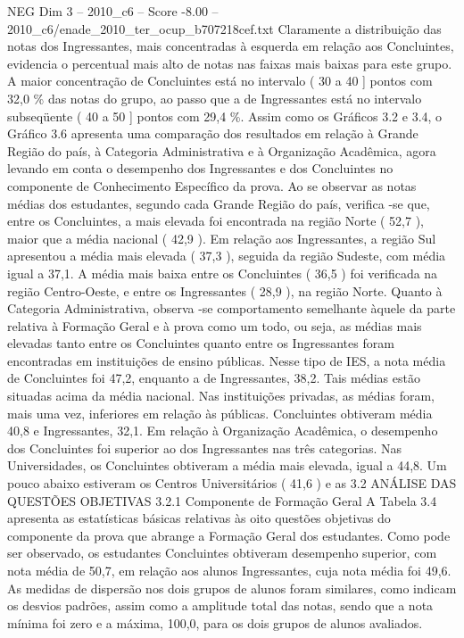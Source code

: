 \begin{textsample}{NEG Dim 3 – 2010\_c6 – Score -8.00 – 2010\_c6/enade\_2010\_ter\_ocup\_b707218cef.txt}
Claramente a distribuição das notas dos Ingressantes, mais concentradas à esquerda em relação aos Concluintes, evidencia o percentual mais alto de notas nas faixas mais baixas para este grupo.
A maior concentração de Concluintes está no intervalo ( 30 a 40 ] pontos com 32,0 \% das notas do grupo, ao passo que a de Ingressantes está no intervalo subseqüente ( 40 a 50 ] pontos com 29,4 \%.
Assim como os Gráficos 3.2 e 3.4, o Gráfico 3.6 apresenta uma comparação dos resultados em relação à Grande Região do país, à Categoria Administrativa e à Organização Acadêmica, agora levando em conta o desempenho dos Ingressantes e dos Concluintes no componente de Conhecimento Específico da prova.
Ao se observar as notas médias dos estudantes, segundo cada Grande Região do país, verifica -se que, entre os Concluintes, a mais elevada foi encontrada na região Norte ( 52,7 ), maior que a média nacional ( 42,9 ).
Em relação aos Ingressantes, a região Sul apresentou a média mais elevada ( 37,3 ), seguida da região Sudeste, com média igual a 37,1.
A média mais baixa entre os Concluintes ( 36,5 ) foi verificada na região Centro-Oeste, e entre os Ingressantes ( 28,9 ), na região Norte.
Quanto à Categoria Administrativa, observa -se comportamento semelhante àquele da parte relativa à Formação Geral e à prova como um todo, ou seja, as médias mais elevadas tanto entre os Concluintes quanto entre os Ingressantes foram encontradas em instituições de ensino públicas.
Nesse tipo de IES, a nota média de Concluintes foi 47,2, enquanto a de Ingressantes, 38,2.
Tais médias estão situadas acima da média nacional.
Nas instituições privadas, as médias foram, mais uma vez, inferiores em relação às públicas.
Concluintes obtiveram média 40,8 e Ingressantes, 32,1.
Em relação à Organização Acadêmica, o desempenho dos Concluintes foi superior ao dos Ingressantes nas três categorias.
Nas Universidades, os Concluintes obtiveram a média mais elevada, igual a 44,8.
Um pouco abaixo estiveram os Centros Universitários ( 41,6 ) e as 3.2 ANÁLISE DAS QUESTÕES OBJETIVAS 3.2.1 Componente de Formação Geral A Tabela 3.4 apresenta as estatísticas básicas relativas às oito questões objetivas do componente da prova que abrange a Formação Geral dos estudantes.
Como pode ser observado, os estudantes Concluintes obtiveram desempenho superior, com nota média de 50,7, em relação aos alunos Ingressantes, cuja nota média foi 49,6.
As medidas de dispersão nos dois grupos de alunos foram similares, como indicam os desvios padrões, assim como a amplitude total das notas, sendo que a nota mínima foi zero e a máxima, 100,0, para os dois grupos de alunos avaliados.

\end{textsample}
